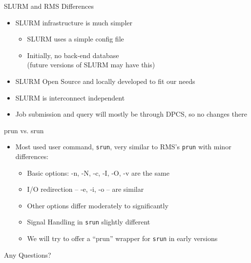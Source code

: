 \documentclass[%
letterpaper,
pdf,
colorBG,
slideColor,
alienglow
]{prosper}
\begin{document}
\begin{slide}{SLURM and RMS Differences}
\raggedright
\begin{itemize}
\item SLURM infrastructure is much simpler 
  \begin{itemize}
  \item SLURM uses a simple config file 
  \item Initially, no back-end database \\ 
        (future versions of SLURM may have this)
  \end{itemize}
\item SLURM Open Source and locally developed to fit our needs
\item SLURM is interconnect independent
\item Job submission and query will mostly be through DPCS, so no changes
      there
\end{itemize}
\end{slide}

\begin{slide}{prun vs. srun}
\raggedright
\begin{itemize}
\item Most used user command, {\tt srun}, very similar to RMS's {\tt prun}
      with minor differences:
  \begin{itemize}
  \item Basic options: -n,  -N, -c, -I, -O, -v are the same
  \item I/O redirection --  -e, -i, -o -- are similar
  \item Other options differ moderately to significantly
  \item Signal Handling in {\tt srun} slightly different
  \item We will try to offer a ``prun'' wrapper for {\tt srun} in early versions
  \end{itemize}
\end{itemize}
\end{slide}

\begin{slide}{Any Questions?}
\hfill \hfill {} \hfill
\end{slide}
\end{document}
